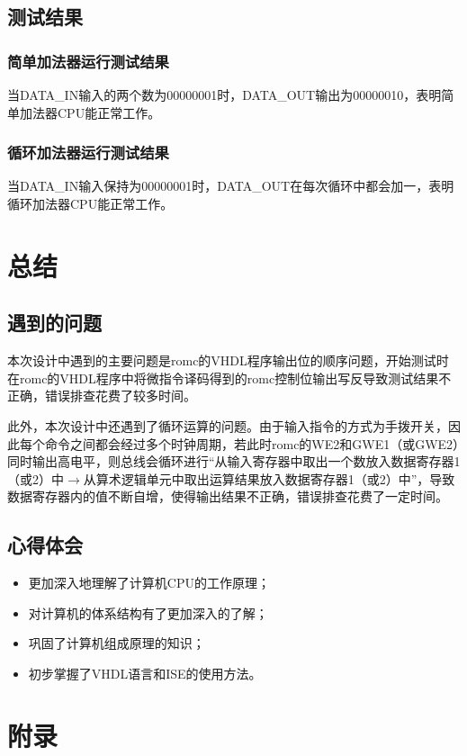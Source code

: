 \documentclass[a4paper]{ctexart}
\begin{document}
\begin{spacing}{1.3}
\subsection{测试结果}
\subsubsection{简单加法器运行测试结果}
当DATA\_IN输入的两个数为00000001时，DATA\_OUT输出为00000010，表明简单加法器CPU能正常工作。

\subsubsection{循环加法器运行测试结果}
当DATA\_IN输入保持为00000001时，DATA\_OUT在每次循环中都会加一，表明循环加法器CPU能正常工作。

\section{总结}
\subsection{遇到的问题}
本次设计中遇到的主要问题是romc的VHDL程序输出位的顺序问题，开始测试时在romc的VHDL程序中将微指令译码得到的romc控制位输出写反导致测试结果不正确，错误排查花费了较多时间。

此外，本次设计中还遇到了循环运算的问题。由于输入指令的方式为手拨开关，因此每个命令之间都会经过多个时钟周期，若此时romc的WE2和GWE1（或GWE2）同时输出高电平，则总线会循环进行“从输入寄存器中取出一个数放入数据寄存器1（或2）中$\rightarrow$从算术逻辑单元中取出运算结果放入数据寄存器1（或2）中”，导致数据寄存器内的值不断自增，使得输出结果不正确，错误排查花费了一定时间。

\subsection{心得体会}
\begin{itemize}
	\item 更加深入地理解了计算机CPU的工作原理；
	\item 对计算机的体系结构有了更加深入的了解；
	\item 巩固了计算机组成原理的知识；
	\item 初步掌握了VHDL语言和ISE的使用方法。
\end{itemize}

\end{spacing}
\newpage
\section*{附录}\appendix
\end{document}
